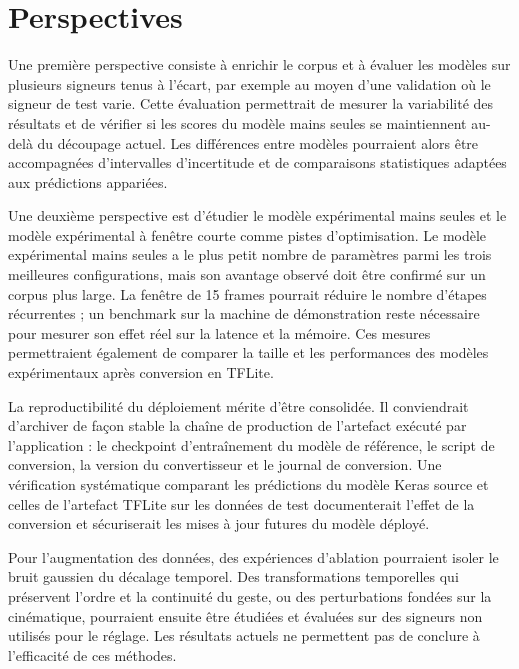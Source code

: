 \section{Perspectives}

Une première perspective consiste à enrichir le corpus et à évaluer les modèles sur plusieurs signeurs tenus à l'écart, par exemple au moyen d'une validation où le signeur de test varie. Cette évaluation permettrait de mesurer la variabilité des résultats et de vérifier si les scores du modèle mains seules se maintiennent au-delà du découpage actuel. Les différences entre modèles pourraient alors être accompagnées d'intervalles d'incertitude et de comparaisons statistiques adaptées aux prédictions appariées.

Une deuxième perspective est d'étudier le modèle expérimental mains seules et le modèle expérimental à fenêtre courte comme pistes d'optimisation. Le modèle expérimental mains seules a le plus petit nombre de paramètres parmi les trois meilleures configurations, mais son avantage observé doit être confirmé sur un corpus plus large. La fenêtre de 15 frames pourrait réduire le nombre d'étapes récurrentes ; un benchmark sur la machine de démonstration reste nécessaire pour mesurer son effet réel sur la latence et la mémoire. Ces mesures permettraient également de comparer la taille et les performances des modèles expérimentaux après conversion en TFLite.

La reproductibilité du déploiement mérite d'être consolidée. Il conviendrait d'archiver de façon stable la chaîne de production de l'artefact exécuté par l'application : le checkpoint d'entraînement du modèle de référence, le script de conversion, la version du convertisseur et le journal de conversion. Une vérification systématique comparant les prédictions du modèle Keras source et celles de l'artefact TFLite sur les données de test documenterait l'effet de la conversion et sécuriserait les mises à jour futures du modèle déployé.

Pour l'augmentation des données, des expériences d'ablation pourraient isoler le bruit gaussien du décalage temporel. Des transformations temporelles qui préservent l'ordre et la continuité du geste, ou des perturbations fondées sur la cinématique, pourraient ensuite être étudiées et évaluées sur des signeurs non utilisés pour le réglage. Les résultats actuels ne permettent pas de conclure à l'efficacité de ces méthodes.

